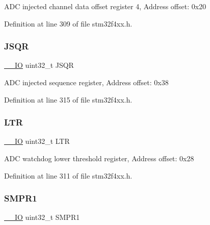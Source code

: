 A\+DC injected channel data offset register 4, Address offset\+: 0x20 

Definition at line 309 of file stm32f4xx.\+h.

\mbox{\label{struct_a_d_c___type_def_a75e0cc079831adcc051df456737d3ae4}} 
\subsubsection{\texorpdfstring{J\+S\+QR}{JSQR}}
{\footnotesize\ttfamily \hyperlink{group___c_m_s_i_s__core__definitions_gaec43007d9998a0a0e01faede4133d6be}{\+\_\+\+\_\+\+IO} uint32\+\_\+t J\+S\+QR}

A\+DC injected sequence register, Address offset\+: 0x38 

Definition at line 315 of file stm32f4xx.\+h.

\mbox{\label{struct_a_d_c___type_def_a9f8712dfef7125c0bb39db11f2b7416b}} 
\subsubsection{\texorpdfstring{L\+TR}{LTR}}
{\footnotesize\ttfamily \hyperlink{group___c_m_s_i_s__core__definitions_gaec43007d9998a0a0e01faede4133d6be}{\+\_\+\+\_\+\+IO} uint32\+\_\+t L\+TR}

A\+DC watchdog lower threshold register, Address offset\+: 0x28 

Definition at line 311 of file stm32f4xx.\+h.

\mbox{\label{struct_a_d_c___type_def_af9d6c604e365c7d9d7601bf4ef373498}} 
\subsubsection{\texorpdfstring{S\+M\+P\+R1}{SMPR1}}
{\footnotesize\ttfamily \hyperlink{group___c_m_s_i_s__core__definitions_gaec43007d9998a0a0e01faede4133d6be}{\+\_\+\+\_\+\+IO} uint32\+\_\+t S\+M\+P\+R1}

